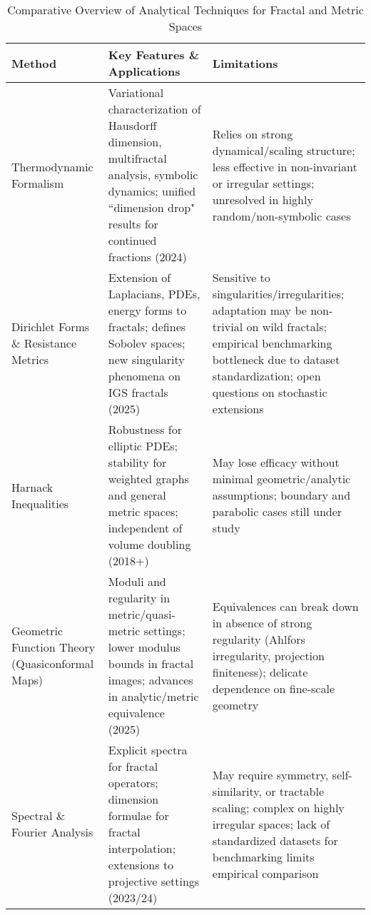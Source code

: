 \documentclass[sigconf]{acmart}
\begin{document}
\begin{table*}[htbp]
\centering
\caption{Comparative Overview of Analytical Techniques for Fractal and Metric Spaces}
\label{tab:analytical_methods}
\begin{adjustbox}{max width=\textwidth}
\begin{tabular}{lll}
\toprule
\textbf{Method} & \textbf{Key Features \& Applications} & \textbf{Limitations} \\
\midrule
Thermodynamic Formalism & Variational characterization of Hausdorff dimension, multifractal analysis, symbolic dynamics; unified ``dimension drop" results for continued fractions (2024)~\cite{ref38,ref13} & Relies on strong dynamical/scaling structure; less effective in non-invariant or irregular settings; unresolved in highly random/non-symbolic cases \\
Dirichlet Forms \& Resistance Metrics & Extension of Laplacians, PDEs, energy forms to fractals; defines Sobolev spaces; new singularity phenomena on IGS fractals (2025)~\cite{ref13,ref43,ref40} & Sensitive to singularities/irregularities; adaptation may be non-trivial on wild fractals; empirical benchmarking bottleneck due to dataset standardization; open questions on stochastic extensions \\
Harnack Inequalities & Robustness for elliptic PDEs; stability for weighted graphs and general metric spaces; independent of volume doubling (2018+)~\cite{ref38,ref40} & May lose efficacy without minimal geometric/analytic assumptions; boundary and parabolic cases still under study \\
Geometric Function Theory (Quasiconformal Maps) & Moduli and regularity in metric/quasi-metric settings; lower modulus bounds in fractal images; advances in analytic/metric equivalence (2025)~\cite{ref47} & Equivalences can break down in absence of strong regularity (Ahlfors irregularity, projection finiteness); delicate dependence on fine-scale geometry \\
Spectral \& Fourier Analysis & Explicit spectra for fractal operators; dimension formulae for fractal interpolation; extensions to projective settings (2023/24)~\cite{ref28,ref32,ref33,ref34} & May require symmetry, self-similarity, or tractable scaling; complex on highly irregular spaces; lack of standardized datasets for benchmarking limits empirical comparison \\
\bottomrule
\end{tabular}
\end{adjustbox}
\end{table*}
\end{document}
